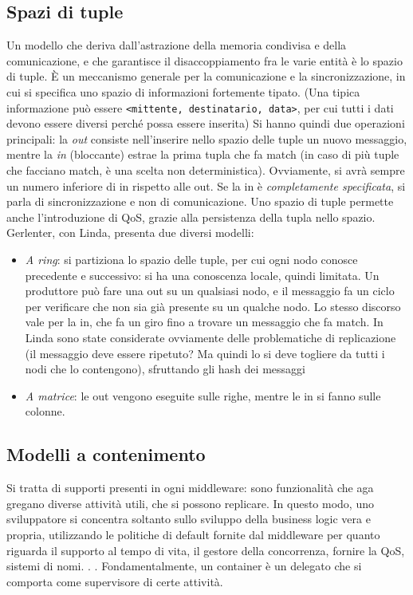 \subsection{Spazi di tuple}
Un modello che deriva dall'astrazione della memoria condivisa e della comunicazione, e che garantisce il
disaccoppiamento fra le varie entità è lo spazio di tuple. È un meccanismo generale per la comunicazione e la
sincronizzazione, in cui si specifica uno spazio di informazioni fortemente tipato. (Una tipica informazione può essere
\texttt{<mittente, destinatario, data>}, per cui tutti i dati devono essere diversi perché possa essere inserita)
Si hanno quindi due operazioni principali: la \textit{out} consiste nell'inserire nello spazio delle tuple un nuovo
messaggio, mentre la \textit{in} (bloccante) estrae la prima tupla che fa match (in caso di più tuple che facciano
match, è una scelta non deterministica). Ovviamente, si avrà sempre un numero inferiore di in rispetto alle out. Se 
la in è \textit{completamente specificata}, si parla di sincronizzazione e non di comunicazione. Uno spazio di tuple
permette anche l'introduzione di QoS, grazie alla persistenza della tupla nello spazio.
Gerlenter, con Linda, presenta due diversi modelli:
\begin{itemize}
 \item \textit{A ring}: si partiziona lo spazio delle tuple, per cui ogni nodo conosce precedente e successivo: si ha
 una conoscenza locale, quindi limitata. Un produttore può fare una out su un qualsiasi nodo, e il messaggio fa un
 ciclo per verificare che non sia già presente su un qualche nodo. Lo stesso discorso vale per la in, che fa un giro
 fino a trovare un messaggio che fa match. In Linda sono state considerate ovviamente delle problematiche di
 replicazione (il messaggio deve essere ripetuto? Ma quindi lo si deve togliere da tutti i nodi che lo contengono),
 sfruttando gli hash dei messaggi 
 \item \textit{A matrice}: le out vengono eseguite sulle righe, mentre le in si fanno sulle colonne.
\end{itemize}
\subsection{Modelli a contenimento}
Si tratta di supporti presenti in ogni middleware: sono funzionalità che aga
gregano diverse attività utili, che si possono replicare. In questo modo, uno
sviluppatore si concentra soltanto sullo sviluppo della business logic vera e
propria, utilizzando le politiche di default fornite dal middleware per quanto
riguarda il supporto al tempo di vita, il gestore della concorrenza, fornire la
QoS, sistemi di nomi. . . Fondamentalmente, un container è un delegato che si
comporta come supervisore di certe attività.
